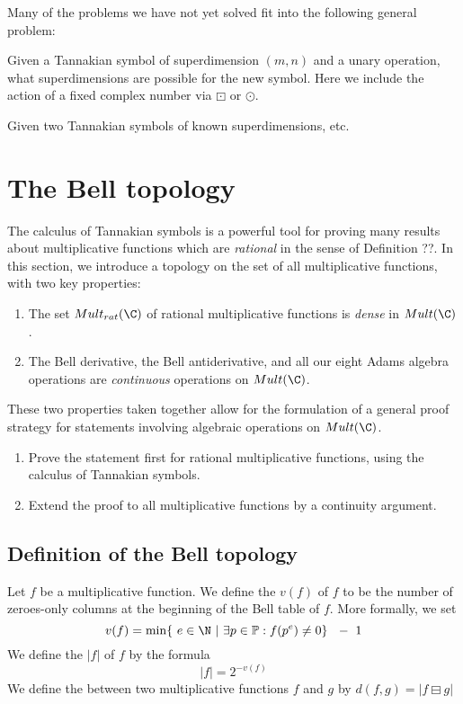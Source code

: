 \documentclass[a4paper]{article}
\begin{document}
Many of the problems we have not yet solved fit into the following general problem: 

Given a Tannakian symbol of superdimension $(m,n)$ and a unary operation, what superdimensions are possible for the new symbol. Here we include the action of a fixed complex number via $\boxdot$ or $\odot$.

Given two Tannakian symbols of known superdimensions, etc. 


\section{The Bell topology}  \label{sec:BellTopology}

The calculus of Tannakian symbols is a powerful tool for proving many results about multiplicative functions which are \emph{rational} in the sense of Definition ??. In this section, we introduce a topology on the set of all multiplicative functions, with two key properties:
\begin{enumerate}
\item The set $Mult_{rat}(\C)$ of rational multiplicative functions is \emph{dense} in $Mult(\C)$.
\item The Bell derivative, the Bell antiderivative, and all our eight Adams algebra operations are \emph{continuous} operations on $Mult(\C)$. 

\end{enumerate}

These two properties taken together allow for the formulation of a general proof strategy for statements involving algebraic operations on $Mult(\C)$.
\begin{enumerate}
\item Prove the statement first for rational multiplicative functions, using the calculus of Tannakian symbols.
\item Extend the proof to all multiplicative functions by a continuity argument.
\end{enumerate} 

\subsection{Definition of the Bell topology}


\begin{definition}
Let $f$ be a multiplicative function. We define the  $v(f)$ of $f$ to be the number of zeroes-only columns at the beginning of the Bell table of $f$. More formally, we set 
$$  v(f) = \min \{ \ e \in \N \ \vert \ \exists p \in \mathbb{P}:  f(p^e) \neq 0 \} \ \ - \ 1   $$
We define the  $\vert  f \vert$ of $f$ by the formula
$$  \vert f \vert = 2^{-v(f)}  $$
We define the  between two multiplicative functions $f$ and $g$ by
$d(f, g) = \vert   f \boxminus g \vert$
\end{definition}
\end{document}
